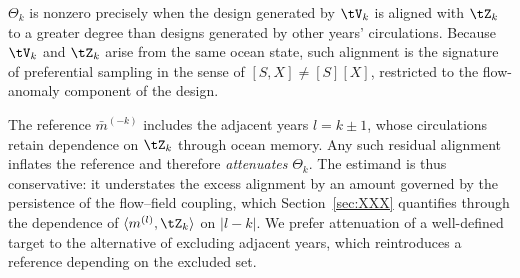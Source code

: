 \begin{remark}
\label{rem:interpretation}
$\Theta_k$ is nonzero precisely when the design generated by $\tV_k$ is aligned with $\tZ_k$ to a
greater degree than designs generated by other years' circulations. Because $\tV_k$ and $\tZ_k$
arise from the same ocean state, such alignment is the signature of preferential sampling in the
sense of $[S,X] \neq [S][X]$, restricted to the flow-anomaly component of the design.

The reference $\bar{m}^{(-k)}$ includes the adjacent years $l = k \pm 1$, whose circulations retain
dependence on $\tZ_k$ through ocean memory. Any such residual alignment inflates the reference and
therefore \emph{attenuates} $\Theta_k$. The estimand is thus conservative: it understates the
excess alignment by an amount governed by the persistence of the flow--field coupling, which
Section~\ref{sec:XXX} quantifies through the dependence of $\langle m^{(l)}, \tZ_k\rangle$ on
$|l-k|$. We prefer attenuation of a well-defined target to the alternative of excluding adjacent
years, which reintroduces a reference depending on the excluded set.
\end{remark}

